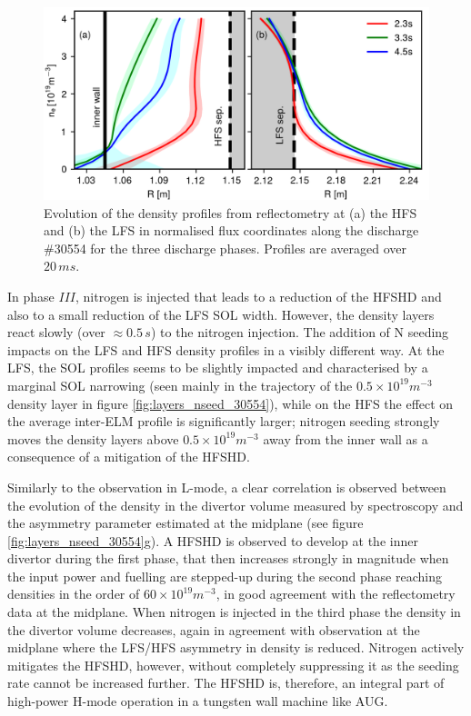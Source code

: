 \documentclass[12pt]{iopart}
\begin{document}
\begin{figure}[!bt]
    \centering
    \includegraphics[]{Figure3.png}
    \caption[Density profile evolution for discharge \#30554.]{Evolution of the density profiles from reflectometry at (a) the HFS and (b) the LFS in normalised flux coordinates along the discharge \#30554 for the three discharge phases. Profiles are averaged over $20\,ms$.}
    \label{fig:perfs_30554}
\end{figure}

In phase $III$, nitrogen is injected that leads to a reduction of the HFSHD and also to a small reduction of the LFS SOL width. However, the density layers react slowly (over $\approx 0.5\,s$) to  the nitrogen injection.
The addition of N seeding impacts on the LFS and HFS density profiles in a visibly different way. At the LFS, the SOL profiles seems to be slightly impacted and characterised by a marginal SOL narrowing (seen mainly in the trajectory of the $0.5\times10^{19}m^{-3}$ density layer in figure \ref{fig:layers_nseed_30554}), while on the HFS the effect on the average inter-ELM profile is significantly larger; nitrogen seeding strongly moves the density layers above $0.5\times10^{19}m^{-3}$ away from the inner wall as a consequence of a mitigation of the HFSHD. 

Similarly to the observation in L-mode, a clear correlation is observed between the evolution of the density in the divertor volume measured by spectroscopy and the asymmetry parameter estimated at the midplane (see figure \ref{fig:layers_nseed_30554}g). A HFSHD is observed to develop at the inner divertor during the first phase, that then increases strongly in magnitude when the input power and fuelling are stepped-up during the second phase reaching densities in the order of $60\times10^{19}m^{-3}$, in good agreement with the reflectometry data at the midplane. When nitrogen is injected in the third phase the density in the divertor volume decreases, again in agreement with observation at the midplane where the LFS/HFS asymmetry in density is reduced. Nitrogen actively mitigates the HFSHD, however, without completely suppressing it as the seeding rate cannot be increased further. The HFSHD is, therefore, an integral part of high-power H-mode operation in a tungsten wall machine like AUG.
\end{document}

